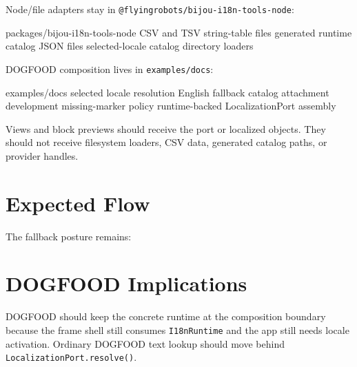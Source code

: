Node/file adapters stay in \texttt{@\allowbreak{}f\allowbreak{}l\allowbreak{}y\allowbreak{}i\allowbreak{}n\allowbreak{}g\allowbreak{}r\allowbreak{}o\allowbreak{}b\allowbreak{}o\allowbreak{}t\allowbreak{}s\allowbreak{}/\allowbreak{}b\allowbreak{}i\allowbreak{}j\allowbreak{}o\allowbreak{}u\allowbreak{}-\allowbreak{}i\allowbreak{}1\allowbreak{}8\allowbreak{}n\allowbreak{}-\allowbreak{}t\allowbreak{}o\allowbreak{}o\allowbreak{}l\allowbreak{}s\allowbreak{}-\allowbreak{}n\allowbreak{}o\allowbreak{}d\allowbreak{}e}:

\begin{CodeBlock}
packages/bijou-i18n-tools-node
  CSV and TSV string-table files
  generated runtime catalog JSON files
  selected-locale catalog directory loaders
\end{CodeBlock}

DOGFOOD composition lives in \texttt{e\allowbreak{}x\allowbreak{}a\allowbreak{}m\allowbreak{}p\allowbreak{}l\allowbreak{}e\allowbreak{}s\allowbreak{}/\allowbreak{}d\allowbreak{}o\allowbreak{}c\allowbreak{}s}:

\begin{CodeBlock}
examples/docs
  selected locale resolution
  English fallback catalog attachment
  development missing-marker policy
  runtime-backed LocalizationPort assembly
\end{CodeBlock}

Views and block previews should receive the port or localized objects. They should not receive filesystem loaders, CSV data, generated catalog paths, or provider handles.

\section{Expected Flow}\label{record-195-expected-flow}



The fallback posture remains:



\section{DOGFOOD Implications}\label{record-195-dogfood-implications}

DOGFOOD should keep the concrete runtime at the composition boundary because the frame shell still consumes \texttt{I\allowbreak{}1\allowbreak{}8\allowbreak{}n\allowbreak{}R\allowbreak{}u\allowbreak{}n\allowbreak{}t\allowbreak{}i\allowbreak{}m\allowbreak{}e} and the app still needs locale activation. Ordinary DOGFOOD text lookup should move behind \texttt{L\allowbreak{}o\allowbreak{}c\allowbreak{}a\allowbreak{}l\allowbreak{}i\allowbreak{}z\allowbreak{}a\allowbreak{}t\allowbreak{}i\allowbreak{}o\allowbreak{}n\allowbreak{}P\allowbreak{}o\allowbreak{}r\allowbreak{}t\allowbreak{}.\allowbreak{}r\allowbreak{}e\allowbreak{}s\allowbreak{}o\allowbreak{}l\allowbreak{}v\allowbreak{}e\allowbreak{}(\allowbreak{})}.

